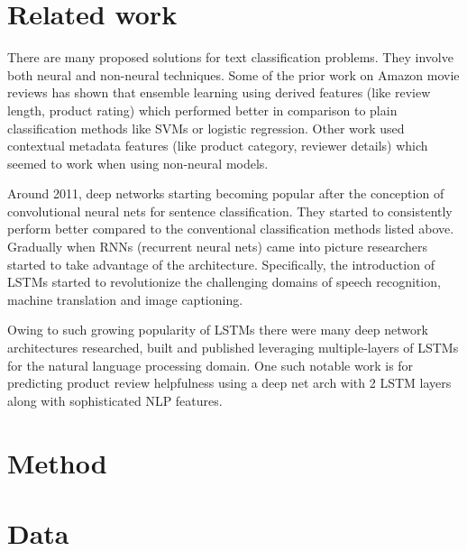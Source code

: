 \documentclass[a4paper,11pt]{article}
\begin{document}

\section{Related work}

There are many proposed solutions for text classification problems. They involve both neural and non-neural techniques. Some of the prior work on Amazon movie reviews has shown that ensemble learning using derived features (like review length, product rating) which performed better in comparison to plain classification methods like SVMs or logistic regression.
Other work used contextual metadata features (like product category, reviewer details) which seemed to work when using non-neural models.

Around 2011, deep networks starting becoming popular after the conception of convolutional neural nets\cite{DBLP:journals/corr/Kim14f} for sentence classification. They started to consistently perform better compared to the conventional classification methods listed above. Gradually when RNNs (recurrent neural nets) came into picture researchers started to take advantage of the architecture. Specifically, the introduction of LSTMs started to revolutionize the challenging domains of speech recognition, machine translation and image captioning.

Owing to such growing popularity of LSTMs there were many deep network architectures researched, built and published leveraging multiple-layers of LSTMs for the natural language processing domain. One such notable work is for predicting product review helpfulness using a deep net arch with 2 LSTM layers along with sophisticated NLP features\cite{wei}. 

\section{Method}


\section{Data}\label{sec:data}
\end{document}
